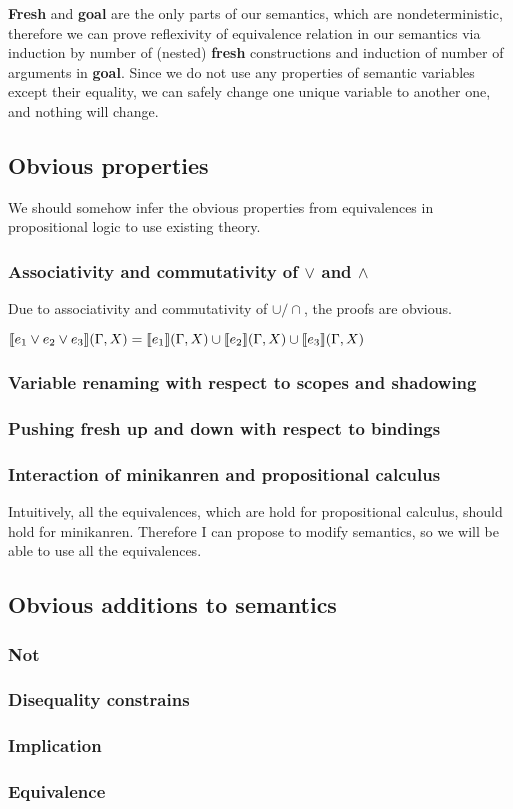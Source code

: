 \documentclass[fleqn]{article}
\begin{document}
\textbf{Fresh} and \textbf{goal} are the only parts of our semantics, which are nondeterministic, therefore we can prove reflexivity of equivalence relation in our semantics via induction by number of (nested) \textbf{fresh} constructions and induction of number of arguments in \textbf{goal}. Since we do not use any properties of semantic variables except their equality, we can safely change one unique variable to another one, and nothing will change.

\subsection{Obvious properties}

We should somehow infer the obvious properties from equivalences in propositional logic to use existing theory. 

\subsubsection{Associativity and commutativity of \(\vee\) and \(\wedge\)}

Due to associativity and commutativity of \(\cup/\cap\), the proofs are obvious.

\(\llbracket e_1 \vee e_2 \vee e_3\rrbracket(\Gamma, X) = \llbracket e_1\rrbracket(\Gamma, X) \cup \llbracket e_2\rrbracket(\Gamma, X) \cup \llbracket e_3\rrbracket(\Gamma, X)\)

\subsubsection{Variable renaming with respect to scopes and shadowing}
\subsubsection{Pushing fresh up and down with respect to bindings}
\subsubsection{Interaction of minikanren and propositional calculus}

Intuitively, all the equivalences, which are hold for propositional calculus, should hold for minikanren. Therefore I can propose to modify semantics, so we will be able to use all the equivalences. 

\subsection{Obvious additions to semantics}
\subsubsection{Not}
\subsubsection{Disequality constrains}
\subsubsection{Implication}
\subsubsection{Equivalence}
\end{document}
